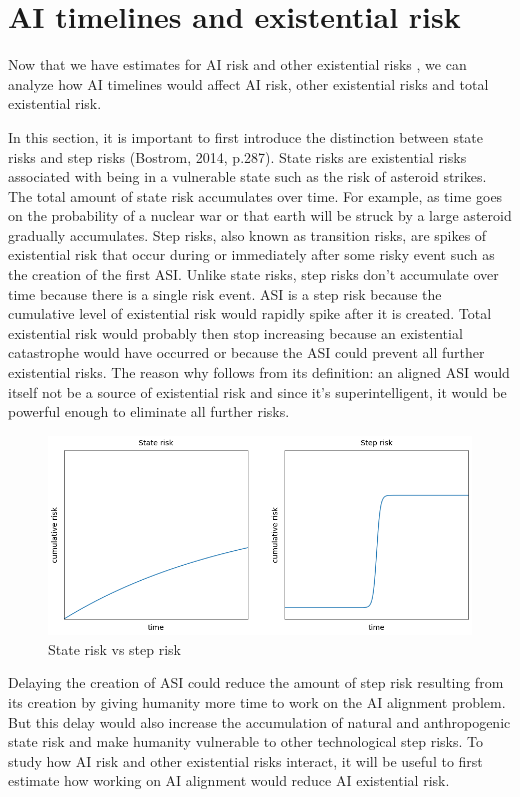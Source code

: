 \documentclass{article}
\begin{document}
\section{AI timelines and existential risk}

Now that we have estimates for AI risk and other existential risks \cite{theprecipice}, we can analyze how AI timelines would affect AI risk, other existential risks and total existential risk.

In this section, it is important to first introduce the distinction between state risks and step risks (Bostrom, 2014, p.287). State risks are existential risks associated with being in a vulnerable state such as the risk of asteroid strikes. The total amount of state risk accumulates over time. For example, as time goes on the probability of a nuclear war or that earth will be struck by a large asteroid gradually accumulates. Step risks, also known as transition risks, are spikes of existential risk that occur during or immediately after some risky event such as the creation of the first ASI. Unlike state risks, step risks don’t accumulate over time because there is a single risk event. ASI is a step risk because the cumulative level of existential risk would rapidly spike after it is created. Total existential risk would probably then stop increasing because an existential catastrophe would have occurred or because the ASI could prevent all further existential risks. The reason why follows from its definition: an aligned ASI would itself not be a source of existential risk and since it's superintelligent, it would be powerful enough to eliminate all further risks.

\begin{figure}[h]
    \includegraphics[width=12cm]{step-risk-vs-state-risk}
    \centering
    \caption{State risk vs step risk}
\end{figure}

Delaying the creation of ASI could reduce the amount of step risk resulting from its creation by giving humanity more time to work on the AI alignment problem. But this delay would also increase the accumulation of natural and anthropogenic state risk and make humanity vulnerable to other technological step risks. To study how AI risk and other existential risks interact, it will be useful to first estimate how working on AI alignment would reduce AI existential risk.
\end{document}
